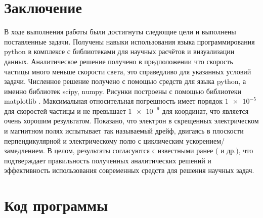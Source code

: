 \documentclass[a4paper]{article}
\begin{document}
\section{Заключение}
В ходе выполнения работы были достигнуты следющие цели и выполнены поставленные задачи. Получены навыки использования языка программирования python в комплексе с библиотеками для научных расчётов и визуализации данных.
Аналитическое решение получено в предположении что скорость частицы много меньше скорости света, это справедливо для указанных условий задачи. Численное решение получено с помощью средств для языка python,  а именно библиотек scipy\cite{web:scipy}, numpy\cite{web:numpy}. Рисунки построены с помощью библиотеки matplotlib \cite{web:matplotlib}. 
Максимальная относительная погрешность имеет порядок  $\num{1e-5}$ для скоростей частицы и не превышает $\num{1e-9}$ для координат, что является очень хорошим результатом. 
Показано, что электрон в скрещенных электрическом и магнитном полях испытывает так называемый дрейф, двигаясь в плоскости перпендикулярной и электрическому полю с циклическим ускорением/замедлением.
В целом, результаты согласуются с известными ранее (\cite{Landau:field} и др.), что подтверждает правильность полученных аналитических решений и эффективность использования современных средств для решения научных задач.

\clearpage
\section{Код программы}\label{code}
\singlespace


\onehalfspacing
\end{document}
